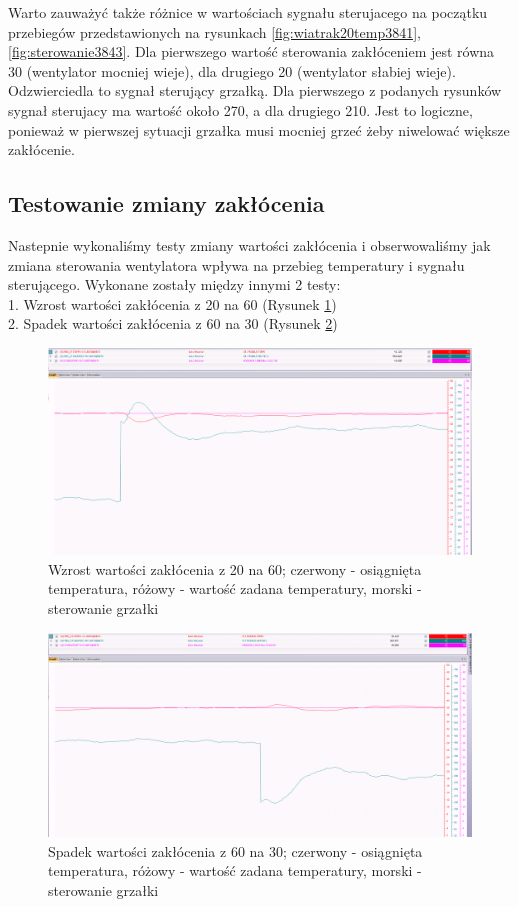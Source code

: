 \documentclass[12pt, a4paper]{article}
\begin{document}
Warto zauważyć także różnice w wartościach sygnału sterujacego na początku przebiegów przedstawionych na rysunkach  \ref{fig:wiatrak20temp3841}, \ref{fig:sterowanie3843}. Dla pierwszego wartość sterowania zakłóceniem jest równa 30 (wentylator mocniej wieje), dla drugiego 20 (wentylator słabiej wieje). Odzwierciedla to sygnał sterujący grzałką. Dla pierwszego z podanych rysunków sygnał sterujacy ma wartość około 270, a dla drugiego 210. Jest to logiczne, ponieważ w pierwszej sytuacji grzałka musi mocniej grzeć żeby niwelować większe zakłócenie.

\subsection{Testowanie zmiany zakłócenia}
Nastepnie wykonaliśmy testy zmiany wartości zakłócenia i obserwowaliśmy jak zmiana sterowania wentylatora wpływa na przebieg temperatury i sygnału sterującego. Wykonane zostały między innymi 2 testy: \\
1. Wzrost wartości zakłócenia z 20 na 60 (Rysunek \ref{fig:zaklocenia2060}) \\
2. Spadek wartości zakłócenia z 60 na 30 (Rysunek \ref{fig:zaklocenie6030}) \\

\begin{figure}[H]
	\centering
	\includegraphics[width=0.9\linewidth]{zaklocenia2060}
	\caption{Wzrost wartości zakłócenia z 20 na 60; czerwony - osiągnięta temperatura, różowy - wartość zadana temperatury, morski - sterowanie  grzałki}
	\label{fig:zaklocenia2060}
\end{figure}
\begin{figure}[H]
	\centering
	\includegraphics[width=0.9\linewidth]{zaklocenie6030}
	\caption{Spadek wartości zakłócenia z 60 na 30; czerwony - osiągnięta temperatura, różowy - wartość zadana temperatury, morski - sterowanie  grzałki}
	\label{fig:zaklocenie6030}
\end{figure}
\end{document}
